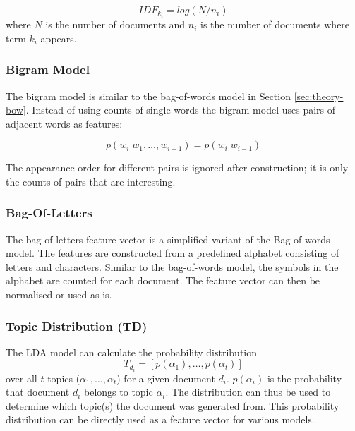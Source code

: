 \begin{equation*} \label{eq:idf}
    IDF_{k_i} = log(N / n_i)
\end{equation*}
where $N$ is the number of documents and $n_i$ is the number of documents where term $k_i$ appears.

\subsubsection{Bigram Model} \label{sec:theory-bigram}
The bigram model is similar to the bag-of-words model in Section \ref{sec:theory-bow}.
Instead of using counts of single words the bigram model uses pairs of adjacent words as features:

\begin{equation*}
    p(w_i|w_1, \ldots, w_{i-1}) = p(w_i|w_{i-1})
\end{equation*}

The appearance order for different pairs is ignored after construction; it is only the counts of pairs that are interesting.

\subsubsection{Bag-Of-Letters} \label{sec:theory-letters}
The bag-of-letters feature vector is a simplified variant of the Bag-of-words model.
The features are constructed from a predefined alphabet consisting of letters and characters.
Similar to the bag-of-words model, the symbols in the alphabet are counted for each document.
The feature vector can then be normalised or used as-is.

\subsubsection{Topic Distribution (TD)}
The LDA model can calculate the probability distribution $$T_{d_i}=[p(\alpha_1),\ldots,p(\alpha_t)]$$ over all $t$ topics ($\alpha_1,\ldots,\alpha_t$) for a given document $d_i$.
$p(\alpha_i)$ is the probability that document $d_i$ belongs to topic $\alpha_i$.
The distribution can thus be used to determine which topic(s) the document was generated from.
This probability distribution can be directly used as a feature vector for various models.

